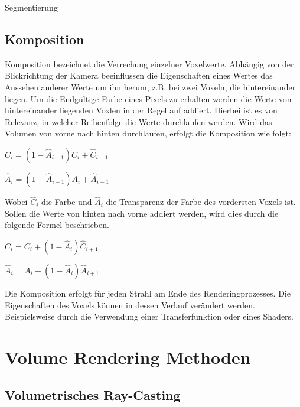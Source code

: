 Segmentierung

\subsection{Komposition}

Komposition bezeichnet die Verrechung einzelner Voxelwerte. Abhängig von der Blickrichtung der Kamera beeinflussen die Eigenschaften eines Wertes das Aussehen anderer Werte um ihn herum, z.B. bei zwei Voxeln, die hintereinander liegen. Um die Endgültige Farbe eines Pixels zu erhalten werden die Werte von hintereinander liegenden Voxlen in der Regel auf addiert. Hierbei ist es von Relevanz, in welcher Reihenfolge die Werte durchlaufen werden. Wird das Volumen von vorne nach hinten durchlaufen, erfolgt die Komposition wie folgt:

$\hat{C}_{i}=(1-\hat{A}_{i-1})C_{i}+\hat{C}_{i-1}$

$\hat{A}_{i}=(1-\hat{A}_{i-1})A_{i}+\hat{A}_{i-1}$

Wobei $\hat{C}_{i}$ die Farbe und $\hat{A}_{i}$ die Transparenz der Farbe des vordersten Voxels ist.
Sollen die Werte von hinten nach vorne addiert werden, wird dies durch die folgende Formel beschrieben.

$\hat{C}_{i}=C_{i}+(1-\hat{A}_{i})\hat{C}_{i+1}$

$\hat{A}_{i}=A_{i}+(1-\hat{A}_{i})\hat{A}_{i+1}$

Die Komposition erfolgt für jeden Strahl am Ende des Renderingprozesses. Die Eigenschaften des Voxels können in dessen Verlauf verändert werden. Beispielsweise durch die Verwendung einer Transferfunktion oder eines Shaders.


\section{Volume Rendering Methoden}

\subsection{Volumetrisches Ray-Casting}
\label{rayCasting}


